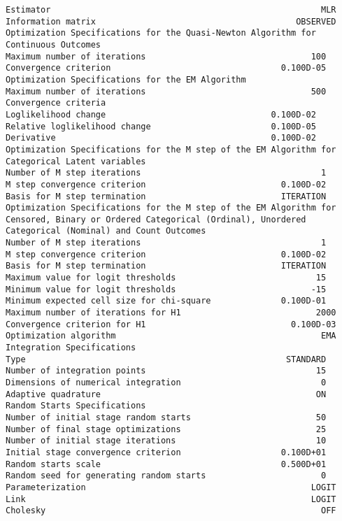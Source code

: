 \begin{verbatim}
Estimator                                                      MLR
Information matrix                                        OBSERVED
Optimization Specifications for the Quasi-Newton Algorithm for
Continuous Outcomes
Maximum number of iterations                                 100
Convergence criterion                                  0.100D-05
Optimization Specifications for the EM Algorithm
Maximum number of iterations                                 500
Convergence criteria
Loglikelihood change                                 0.100D-02
Relative loglikelihood change                        0.100D-05
Derivative                                           0.100D-02
Optimization Specifications for the M step of the EM Algorithm for
Categorical Latent variables
Number of M step iterations                                    1
M step convergence criterion                           0.100D-02
Basis for M step termination                           ITERATION
Optimization Specifications for the M step of the EM Algorithm for
Censored, Binary or Ordered Categorical (Ordinal), Unordered
Categorical (Nominal) and Count Outcomes
Number of M step iterations                                    1
M step convergence criterion                           0.100D-02
Basis for M step termination                           ITERATION
Maximum value for logit thresholds                            15
Minimum value for logit thresholds                           -15
Minimum expected cell size for chi-square              0.100D-01
Maximum number of iterations for H1                           2000
Convergence criterion for H1                             0.100D-03
Optimization algorithm                                         EMA
Integration Specifications
Type                                                    STANDARD
Number of integration points                                  15
Dimensions of numerical integration                            0
Adaptive quadrature                                           ON
Random Starts Specifications
Number of initial stage random starts                         50
Number of final stage optimizations                           25
Number of initial stage iterations                            10
Initial stage convergence criterion                    0.100D+01
Random starts scale                                    0.500D+01
Random seed for generating random starts                       0
Parameterization                                             LOGIT
Link                                                         LOGIT
Cholesky                                                       OFF


\end{verbatim}
